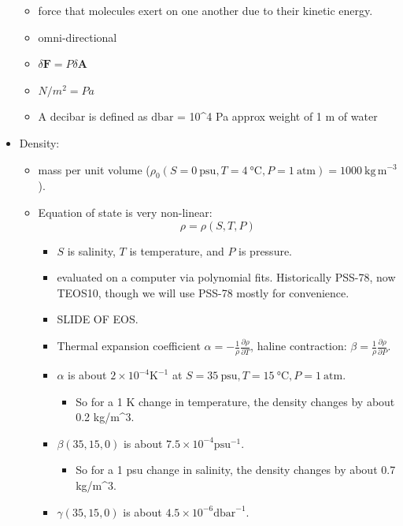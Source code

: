 \begin{itemize}
  \begin{itemize}
  \tightlist
  \item
    force that molecules exert on one another due to their kinetic
    energy.
  \item
    omni-directional
  \item
    \(\delta\mathbf{F} = P \delta\mathbf{A}\)
  \item
    \(N / m^2 = Pa\)
  \item
    A decibar is defined as \(\mathrm{dbar}\) = 10\^{}4 Pa approx weight
    of 1 m of water
  \end{itemize}
\item
  Density:

  \begin{itemize}
  \tightlist
  \item
    mass per unit volume
    (\(\rho_0(S=0\ \mathrm{psu}, T=4\ \mathrm{°C} , P=1\ \mathrm{atm}) = 1000\ \mathrm{kg\,m^{-3}}\)).
  \item
    Equation of state is very non-linear: \[\rho = \rho(S, T, P)\]

    \begin{itemize}
    \tightlist
    \item
      \(S\) is salinity, \(T\) is temperature, and \(P\) is pressure.
    \item
      evaluated on a computer via polynomial fits. Historically PSS-78,
      now TEOS10, though we will use PSS-78 mostly for convenience.
    \item
      SLIDE OF EOS.
    \item
      Thermal expansion coefficient
      \(\alpha = -\frac{1}{\rho}\frac{\partial \rho}{\partial T}\),
      haline contraction:
      \(\beta = \frac{1}{\rho}\frac{\partial \rho}{\partial P}\).
    \item
      \(\alpha\) is about \(2\times10^{-4} \mathrm{K}^{-1}\) at
      \(S=35\ \mathrm{psu}, T=15\ \mathrm{°C}, P=1\ \mathrm{atm}\).

      \begin{itemize}
      \tightlist
      \item
        So for a 1 K change in temperature, the density changes by about
        0.2 kg/m\^{}3.
      \end{itemize}
    \item
      \(\beta(35, 15, 0)\) is about
      \(7.5 \times 10^{-4} \mathrm{psu}^{-1}\).

      \begin{itemize}
      \tightlist
      \item
        So for a 1 psu change in salinity, the density changes by about
        0.7 kg/m\^{}3.
      \end{itemize}
    \item
      \(\gamma(35, 15, 0)\) is about
      \(4.5 \times 10^{-6} \mathrm{dbar}^{-1}\).


\end{itemize}
\end{itemize}
\end{itemize}
